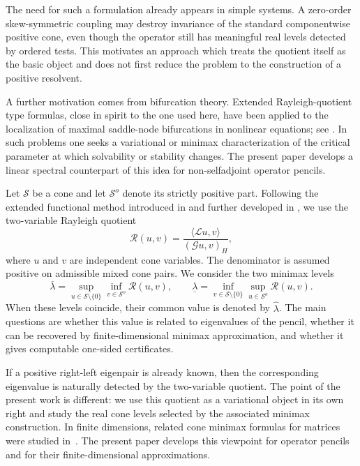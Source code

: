\documentclass[preprint,10pt]{elsarticle}
\theoremstyle{plain}
\theoremstyle{definition}
\theoremstyle{remark}
\begin{document}
The need for such a formulation already appears in simple systems. A
zero-order skew-symmetric coupling may destroy invariance of the standard
componentwise positive cone, even though the operator still has meaningful
real levels detected by ordered tests. This motivates an approach which treats
the quotient itself as the basic object and does not first reduce the problem
to the construction of a positive resolvent.

A further motivation comes from bifurcation theory. Extended
Rayleigh-quotient type formulas, close in spirit to the one used here, have
been applied to the localization of maximal saddle-node bifurcations in
nonlinear equations; see
\cite{ilyasov2021,IlyasJDE24,Ilyasov2026,Salazar2020}. In such problems one
seeks a variational or minimax characterization of the critical parameter at
which solvability or stability changes. The present paper develops a linear
spectral counterpart of this idea for non-selfadjoint operator pencils.

Let \(\mathcal S\) be a cone and let \(\mathcal S^o\) denote its strictly
positive part. Following the extended functional method introduced in
\cite{IlyasFunc} and further developed in
\cite{IlyasJDE24,IlyasovValeev2024}, we use the two-variable Rayleigh quotient
\[
\mathcal R(u,v)
=
\frac{\langle\mathcal L u,v\rangle}{(\mathcal G u,v)_H},
\]
where \(u\) and \(v\) are independent cone variables. The denominator is
assumed positive on admissible mixed cone pairs. We consider the two minimax
levels
\[
\overline\lambda
=
\sup_{u\in\mathcal S\setminus\{0\}}
\inf_{v\in\mathcal S^o}
\mathcal R(u,v),
\qquad
\underline\lambda
=
\inf_{v\in\mathcal S\setminus\{0\}}
\sup_{u\in\mathcal S^o}
\mathcal R(u,v).
\]
When these levels coincide, their common value is denoted by
\(\hat\lambda\). The main questions are whether this value is related to
eigenvalues of the pencil, whether it can be recovered by finite-dimensional
minimax approximation, and whether it gives computable one-sided certificates.

If a positive right-left eigenpair is already known, then the corresponding
eigenvalue is naturally detected by the two-variable quotient. The point of
the present work is different: we use this quotient as a variational object
in its own right and study the real cone levels selected by the associated
minimax construction. In finite dimensions, related cone minimax formulas for
matrices were studied in~\cite{IlyasovValeev2024}. The present paper develops
this viewpoint for operator pencils and for their finite-dimensional
approximations.
\end{document}
